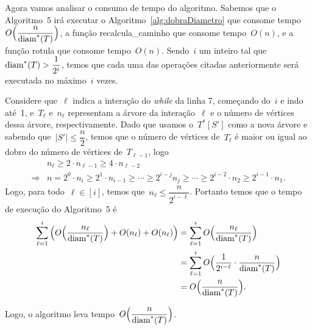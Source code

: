 		\bigskip

		Agora vamos analisar o consumo de tempo do algoritmo.
		Sabemos que o Algoritmo~5 
		irá executar
		o Algoritmo~\ref{alg:dobraDiametro} que consome 
		tempo ~${O\Big(\dfrac{n}{\mathrm{diam}^*(T)}\Big)}$, a função
		{\sc recalcula\_caminho} que consome tempo~$O(n)$, e a função
		{\sc rotula} que consome tempo~$O(n)$.
		Sendo~$i$ um inteiro tal que~$\mathrm{diam}^*(T)>\dfrac{1}{2^i}$, 
		temos que cada uma das operações citadas anteriormente
		será executada no máximo~$i$ vezes.

		Considere que~$\ell$ indica a interação do \textit{while}
		da linha 7,
		começando do~$i$ e indo até~1, e~$T_\ell$ e~$n_\ell$ 
		representam a árvore da interação~$\ell$ e
		o número de vértices dessa árvore, respectivamente.
		Dado que usamos o~$T^*[S']$ como a nova árvore
		e sabendo que~$|S'|\le \dfrac{n}{2}$,
		temos que o número de vértices de~$T_{\ell}$
		é maior ou igual ao 
		dobro do número de vértices de~$T_{\ell-1}$, logo
		\begin{align}
			 & n_{\ell} \ge 2\cdot n_{\ell-1} \ge 4\cdot n_{\ell-2} \nonumber\\
			\Rightarrow & n = 2^0\cdot n_i\ge 2^1\cdot n_{i-1} \ge\cdots\ge
			2^{i-j}n_j\ge\cdots\ge
			 2^{i-2}\cdot n_{2}\ge 2^{i-1}\cdot n_1. \nonumber 
		\end{align}
		Logo, para todo~$\ell\in[i]$, temos que~$n_\ell \le\dfrac{n} {2^{i-\ell}}$.
		Portanto temos que o tempo de execução do Algoritmo~5 é
		\begin{align}
			\displaystyle\sum_{\ell=1}^{i} \Big(O\Big(\dfrac{n_\ell}{\mathrm{diam}^*(T)}\Big)
			+ O(n_\ell) + O(n_\ell)\Big)
			&= \displaystyle\sum_{\ell=1}^{i} O\Big(\dfrac{n_\ell}{\mathrm{diam}^*(T)}\Big) \nonumber\\
			&= \displaystyle\sum_{\ell=1}^{i} O\Big(\dfrac{1}{2^{i-\ell}}
			\cdot\dfrac{n}{\mathrm{diam}^*(T)}\Big) \nonumber\\
			&= O\Big(\dfrac{n}{\mathrm{diam}^*(T)}\Big). \nonumber
		\end{align}

		Logo, o algoritmo leva tempo~$O\Big(\dfrac{n}{\mathrm{diam}^*(T)}\Big)$.
